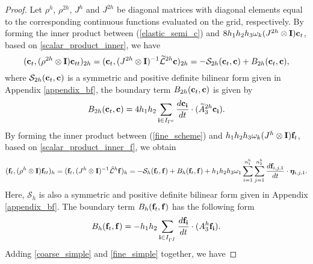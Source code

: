 \begin{proof}
		Let $\rho^{h}$, $\rho^{2h}$, $J^{h}$ and $J^{2h}$ be diagonal matrices with diagonal elements equal to the corresponding continuous functions evaluated on the grid, respectively. 
	By forming the inner product between (\ref{elastic_semi_c}) and $8h_1h_2h_3\omega_k(J^{2h}\otimes {\bf I}){\bf c}_t$, based on \eqref{scalar_product_inner}, we have
	\begin{equation}\label{coarse_simple}
	({\bf c}_t, (\rho^{2h}\otimes {\bf I}){\bf c}_{tt})_{2h} = ({\bf c}_t,(J^{2h}\otimes {\bf I})^{-1}\wt{\mathcal{L}}^{2h}{\bf c})_{2h} = -\mathcal{S}_{2h}({\bf c}_t,{\bf c}) + B_{2h}({\bf c}_t,{{\bf c}}),
	\end{equation}
	where $\mathcal{S}_{2h}({\bf c}_t,{\bf c})$ is a symmetric and positive definite bilinear form given in Appendix \ref{appendix_bf}, the boundary term $B_{2h} ({\bf c}_t,{\bf c})$ is given by
	\begin{equation}\label{bounary_c1}
	B_{2h} ({\bf c}_t,{\bf c}) = 4h_1h_2\sum_{{\bf i}\in I_{\Gamma^c}}\frac{d{\bf c}_{\bf i}}{dt}\cdot (\wt{A}_3^{2h}{\bf c}_{\bf i}).
	\end{equation}
	By forming the inner product between (\ref{fine_scheme}) and $h_1h_2h_3\omega_k(J^h\otimes {\bf I}){\bf f}_t$, based on \eqref{scalar_product_inner_f}, we obtain
	\begin{equation}\label{fine_simple}
	({\bf f}_t, (\rho^h\otimes {\bf I}){\bf f}_{tt})_h = ({\bf f}_t,(J^h\otimes {\bf I})^{-1}\hat{\mathcal{L}}^h{\bf f})_h = -\mathcal{S}_{h}({\bf f}_t,{\bf f}) + B_h({\bf f}_t,{\bf f}) 
	+h_1h_2h_3\omega_1\sum_{i = 1}^{n_1^h}\sum_{j=1}^{n_2^h} \frac{d{\bf f}_{i,j,1}}{dt}\cdot{\bm \eta}_{i,j,1}.
	\end{equation}
Here, $\mathcal{S}_h$ is also a symmetric and positive definite bilinear form given in Appendix \ref{appendix_bf}. The boundary term $B_h ({\bf f}_t,{\bf f})$ has the following form
	\begin{equation}\label{boundary_f1}
	B_h ({\bf f}_t,{\bf f}) = -h_1h_2\sum_{{\bf i}\in I_{\Gamma^f}}\frac{d{\bf f}_{\bf i}}{dt}\cdot(A_3^h {\bf f}_{\bf i}).
	\end{equation}
	 Adding \eqref{coarse_simple} and \eqref{fine_simple} together, we have

\end{proof}
